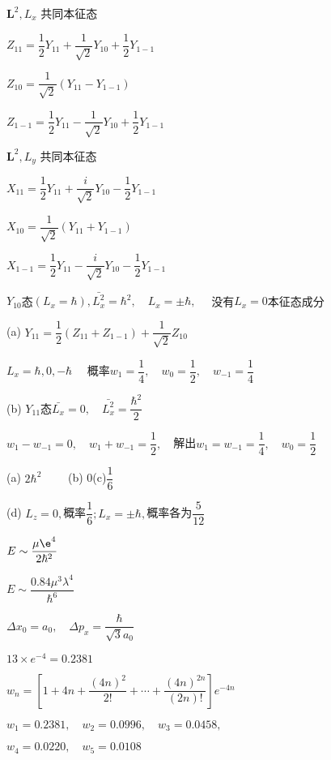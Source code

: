\achapter

\answer $ \boldsymbol{L}^{2},L_{x}$ 共同本征态

	$ Z_{11}=\dfrac{1}{2}Y_{11}+\dfrac{1}{\sqrt{2}}Y_{10}+\dfrac{1}{2}Y_{1-1} $

	$ Z_{10}=\dfrac{1}{\sqrt{2}}(Y_{11}-Y_{1-1}) $

	$ Z_{1-1}=\dfrac{1}{2}Y_{11}-\dfrac{1}{\sqrt{2}}Y_{10}+\dfrac{1}{2}Y_{1-1} $

	$ \boldsymbol{L}^{2},L_{y}$ 共同本征态
	
	$ X_{11}=\dfrac{1}{2}Y_{11}+\dfrac{i}{\sqrt{2}}Y_{10}-\dfrac{1}{2}Y_{1-1} $

	$ X_{10}=\dfrac{1}{\sqrt{2}}(Y_{11}+Y_{1-1}) $

	$ X_{1-1}=\dfrac{1}{2}Y_{11}-\dfrac{i}{\sqrt{2}}Y_{10}-\dfrac{1}{2}Y_{1-1} $

\answer $Y_{10}$态$(L_{x}=\hbar),\bar{L_{x}^{2}}=\hbar^{2},\quad L_{x}=\pm\hbar,\quad $ 没有$L_{x}=0$本征态成分

\answer (a) $Y_{11}=\dfrac{1}{2}(Z_{11}+Z_{1-1})+\dfrac{1}{\sqrt{2}}Z_{10}$

\aindent $ L_{x}=\hbar,0,-\hbar \quad$ 概率$w_{1}=\dfrac{1}{4},\quad w_{0}=\dfrac{1}{2},\quad w_{-1}=\dfrac{1}{4}$ 

		(b) $Y_{11}$态$\bar{L_{x}}=0,\quad \bar{L_{x}^{2}}=\dfrac{\hbar^{2}}{2}$
		
\aindent $ w_{1}-w_{-1}=0,\quad w_{1}+w_{-1}=\dfrac{1}{2},\quad $解出$w_{1}=w_{-1}=\dfrac{1}{4},\quad w_{0}=\dfrac{1}{2} $

\answer (a) $2\hbar^{2}\qquad$ (b) 0\qquad (c)$ \dfrac{1}{6} $

		(d) $L_{z}=0,$概率$\dfrac{1}{6};$\quad $L_{x}=\pm\hbar,$概率各为$\dfrac{5}{12}$

\answer $ E\sim\dfrac{\mu\e^{4}}{2\hbar^{2}} $

\answer $ E\sim\dfrac{0.84\mu^{3}\lambda^{4}}{\hbar^{6}} $


\answer $ \Delta x_{0}=a_{0},\quad \Delta p_{x}=\dfrac{\hbar}{\sqrt{3}a_{0}} $

\answer $ 13\times e^{-4}=\num{0.2381} $

\answer $ w_{n}=\left[1+4n+\dfrac{(4n)^{2}}{2!}+\cdots+\dfrac{(4n)^{2n}}{(2n)!}\right]e^{-4n} $

	$ w_{1}=\num{0.2381},\quad w_{2}=\num{0.0996},\quad w_{3}=\num{0.0458}, $
	
	$ w_{4}=\num{0.0220},\quad w_{5}=\num{0.0108} $


